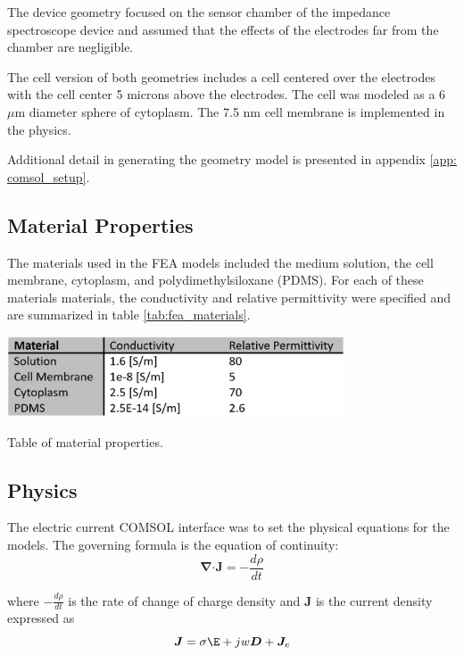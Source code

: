 \par The device geometry focused on the sensor chamber of the impedance spectroscope device and assumed that the effects of the electrodes far from the chamber are negligible. 


\par The cell version of both geometries includes a cell centered over the electrodes with the cell center 5 microns above the electrodes. The cell was modeled as a 6 $\mu$m diameter sphere of cytoplasm. The 7.5 nm cell membrane is implemented in the physics. 

\par Additional detail in generating the geometry model is presented in appendix \ref{app: comsol_setup}.

\subsection*{Material Properties}
\par The materials used in the FEA models included the medium solution, the cell membrane, cytoplasm, and polydimethylsiloxane (PDMS). For each of these materials materials, the conductivity and relative permittivity were specified and are summarized in table \ref{tab:fea_materials}.

\begin{table}[h]
    \centering
    \includegraphics[width=0.75\textwidth]{images/materialpropertiestable.png}
    \caption{Table of material properties.}
    \label{tab:fea_materials}
\end{table}

\subsection*{Physics}
\par The electric current COMSOL interface was to set the physical equations for the models. The governing formula is the equation of continuity:
\begin{equation}
    \boldsymbol\nabla \boldsymbol\cdot \boldsymbol J = -\frac{d\rho}{dt}
\end{equation}

where $-\frac{d\rho}{dt}$ is the rate of change of charge density and $\boldsymbol J$ is the current density expressed as
\begin{equation}
    \boldsymbol J = \sigma\boldsymbol\E + jw\boldsymbol D + \boldsymbol J_e
\end{equation}

